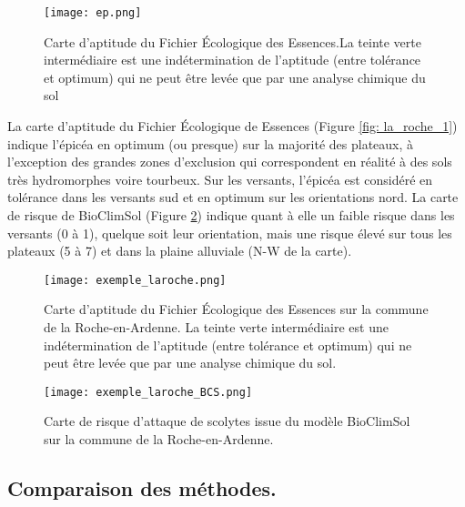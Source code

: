 \begin{figure} [htbp] 
	\centering
	\texttt{[image: ep.png]}
	\caption{Carte d'aptitude du Fichier Écologique des Essences.La teinte verte intermédiaire est une indétermination de l’aptitude
		(entre tolérance et optimum) qui ne peut être levée que par une analyse chimique du sol }
	\label{fig:feev}
\end{figure}






La carte d'aptitude du Fichier Écologique de Essences (Figure \ref{fig: la_roche_1}) indique l'épicéa  en optimum (ou presque) sur la majorité des plateaux, à l'exception des grandes zones d'exclusion qui correspondent en réalité à des sols très hydromorphes voire tourbeux. Sur les versants, l'épicéa est considéré en tolérance dans les versants sud et en optimum sur les orientations nord.
La carte de risque de BioClimSol (Figure \ref{fig: la_roche_2}) indique quant à elle un faible risque dans les versants (0 à 1), quelque soit leur orientation, mais une risque élevé sur tous les plateaux (5 à 7) et dans la plaine alluviale (N-W de la carte).








\begin{figure}[htbp]
	\begin{minipage}[b]{1 \linewidth}
		\centering
		\texttt{[image: exemple\_laroche.png]}
		\caption{Carte d'aptitude du Fichier Écologique des Essences sur la commune de la Roche-en-Ardenne. La teinte verte intermédiaire est une indétermination de l'aptitude (entre tolérance et optimum) qui ne peut être levée que par une analyse chimique du sol. }
		\label{fig: la_roche_1}
		
	\end{minipage}\hfill
	\vspace{1cm}
	\begin{minipage}[b]{1 \linewidth}
		\centering
		\texttt{[image: exemple\_laroche\_BCS.png]}
		\caption{Carte de risque d'attaque de scolytes issue du modèle BioClimSol sur la commune de la Roche-en-Ardenne.}
		\label{fig: la_roche_2}
	\end{minipage}
\end{figure}

\newpage
\subsection{Comparaison des méthodes.}

